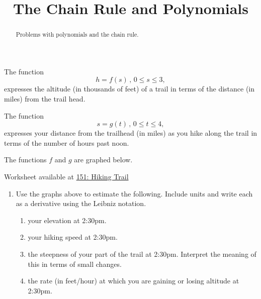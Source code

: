 \documentclass{ximera}
\title{The Chain Rule and Polynomials}
\begin{document}
\begin{abstract}
Problems with polynomials and the chain rule.
\end{abstract}
\maketitle

\begin{question} \label{Q8dfDfrfrf}
The function
\[
      h = f(s) \, , \, 0\leq s \leq 3 ,
\]
expresses the altitude (in thousands of feet) of a trail in terms of the distance (in miles) from the trail head.

The function
\[
    s = g(t) \, , \, 0\leq t \leq 4,
\]
expresses your distance from the trailhead (in miles) as you hike along the trail in terms of the number of hours past noon.

The functions $f$ and $g$ are graphed below.

\begin{onlineOnly}
    \begin{center}
\end{center}
\end{onlineOnly}

Worksheet available at \href{https://www.desmos.com/calculator/x0ywksqpsw}{151: Hiking Trail}


\begin{enumerate}

\item Use the graphs above to estimate the following. Include units and write each as a derivative using the Leibniz notation.

\begin{enumerate}

\item your elevation at 2:30pm.

\item your hiking speed at 2:30pm.

\item the steepness of your part of the trail at 2:30pm. Interpret the meaning of this in terms of small changes.

\item the rate (in feet/hour) at which you are gaining or losing altitude at 2:30pm. 
\end{enumerate}

\end{enumerate}

\end{question}
\end{document}
